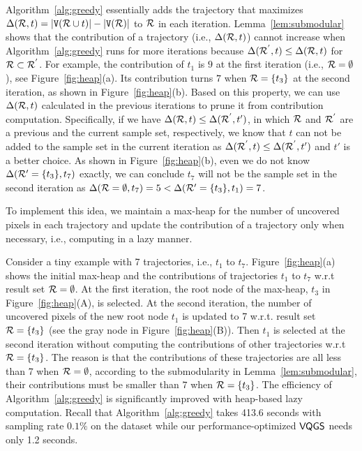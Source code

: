 Algorithm~\ref{alg:greedy} essentially adds the trajectory that maximizes $\Delta(\mathcal{R}, t) = |\mathtt{V}(\mathcal{R} \cup t)| - |\mathtt{V}(\mathcal{R})|$ to $\mathcal{R}$ in each iteration.
Lemma~\ref{lem:submodular} shows that the contribution of a trajectory (i.e., $\Delta(\mathcal{R}, t)$) cannot increase when Algorithm~\ref{alg:greedy} runs for more iterations because $ \Delta(\mathcal{R}^{'}, t) \le \Delta(\mathcal{R}, t) $ for  $\mathcal{R} \subset \mathcal{R}^{'}$.
For example, the contribution of $t_1$ is $9$ at the first iteration (i.e., $\mathcal{R} = \emptyset$), see Figure~\ref{fig:heap}(a).
Its contribution turns $7$ when $\mathcal{R} = \{ t_3 \}$ at the second iteration, as shown in Figure~\ref{fig:heap}(b).
Based on this property, we can use  $\Delta(\mathcal{R}, t)$ calculated in the previous iterations to prune it from contribution computation.
Specifically, if we have $\Delta(\mathcal{R}, t) \le \Delta(\mathcal{R}^{'}, t')$, in which $\mathcal{R}$ and $\mathcal{R}^{'}$ are a previous and the current sample set, respectively,
we know that $t$ can not be added to the sample set in the current iteration as $\Delta(\mathcal{R}^{'}, t)\le \Delta(\mathcal{R}^{'}, t')$ and $t'$ is a better choice.
As shown in Figure~\ref{fig:heap}(b), even we do not know $\Delta(\mathcal{R}'=\{t_3\}, t_7)$ exactly,
we can conclude $t_7$ will not be the sample set in the second iteration as $\Delta(\mathcal{R} = \emptyset, t_7) = 5 < \Delta(\mathcal{R}'=\{t_3\}, t_1) = 7$.


To implement this idea, we maintain a max-heap for the number of uncovered pixels in each trajectory and update the contribution of a trajectory only when necessary, i.e., computing in a lazy manner.

Consider a tiny example with 7 trajectories, i.e., $t_1$ to $t_7$.
Figure~\ref{fig:heap}(a) shows the initial max-heap and the contributions of trajectories $t_1$ to $t_7$ w.r.t result set $\mathcal{R} = \emptyset$.
At the first iteration, the root node of the max-heap, $t_3$ in Figure~\ref{fig:heap}(A), is selected.
At the second iteration, the number of uncovered pixels of the new root node $t_1$ is updated to 7 w.r.t. result set $\mathcal{R} = \{ t_3 \}$ (see the gray node in Figure~\ref{fig:heap}(B)).
Then $t_1$ is selected at the second iteration without computing the contributions of other trajectories w.r.t $\mathcal{R} = \{ t_3 \}$.
The reason is that the contributions of these trajectories are all less than 7 when $\mathcal{R} = \emptyset$,
according to the submodularity in Lemma~\ref{lem:submodular}, their contributions must be smaller than $7$ when $\mathcal{R} = \{ t_3 \}$.
The efficiency of Algorithm~\ref{alg:greedy} is significantly improved with heap-based lazy computation.
Recall that Algorithm~\ref{alg:greedy} takes 413.6 seconds with sampling rate $0.1\%$ on the \pt{} dataset while our performance-optimized $\mathsf{VQGS}$ needs only 1.2 seconds.

